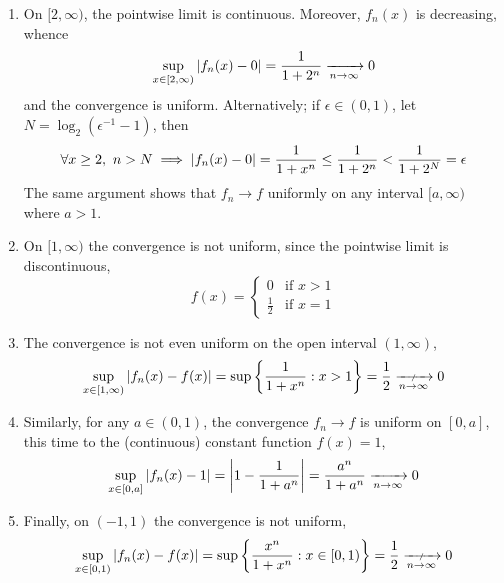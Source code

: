 \begin{examples}{}{}
\begin{enumerate}
  \begin{enumerate}
    \item On $[2,\infty)$, the pointwise limit is continuous. Moreover, $f_n(x)$ is decreasing, whence
    \[\sup_{x\in[2,\infty)}\left| f_n(x)-0\right|=\frac 1{1+2^n}\xrightarrow[n\to\infty]{} 0\]
    and the convergence is uniform. Alternatively; if $\epsilon\in (0,1)$, let $N=\log_2(\epsilon^{-1}-1)$, then
    \[\forall x\ge 2,\ n>N\implies \left| f_n(x)-0\right|=\frac 1{1+x^n}\le \frac 1{1+2^n}<\frac 1{1+2^N}=\epsilon\]
    The same argument shows that $f_n\to f$ uniformly on any interval $[a,\infty)$ where $a>1$.
    \item On $[1,\infty)$ the convergence is not uniform, since the pointwise limit is discontinuous,
		\[f(x)=\begin{cases}
    	0&\text{if }x>1\\
    	\frac 12&\text{if }x=1
    	\end{cases}\]
   	\item The convergence is not even uniform on the open interval $(1,\infty)$,
    \[\sup_{x\in[1,\infty)}\nm{f_n(x)-f(x)}=\sup\left\{\frac 1{1+x^n}:x>1 \right\}=\frac 12\nxrightarrow{n\to\infty} 0\]
    \item Similarly, for any $a\in(0,1)$, the convergence $f_n\to f$ is uniform on $[0,a]$, this time to the (continuous) constant function $f(x)=1$,
    \[\sup_{x\in[0,a]}\left| f_n(x)-1\right|=\left| 1-\frac 1{1+a^n}\right|=\frac{a^n}{1+a^n}\xrightarrow[n\to\infty]{} 0\]
    \item Finally, on $(-1,1)$ the convergence is not uniform,
    \[\sup_{x\in[0,1)}\nm{f_n(x)-f(x)}=\sup\left\{\frac{x^n}{1+x^n}:x\in[0,1) \right\}=\frac 12\nxrightarrow{n\to\infty} 0\]
  \end{enumerate}
\end{enumerate}
\end{examples}

